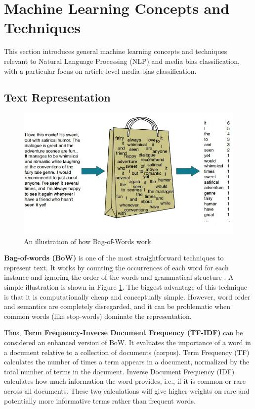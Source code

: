 \section{Machine Learning Concepts and Techniques}

This section introduces general machine learning concepts and techniques relevant to Natural Language Processing (NLP) and media bias classification, with a particular focus on article-level media bias classification.

\subsection{Text Representation}

\begin{figure}[htbp]
    \centering
    \includegraphics[width=0.7\linewidth]{images/bow_illustration.png}
    \caption{An illustration of how Bag-of-Words work \cite{rahul-2023-bow-medium}}
    \label{fig:bow_illustration}
\end{figure}

\textbf{Bag-of-words (BoW)} is one of the most straightforward techniques to represent text. It works by counting the occurrences of each word for each instance and ignoring the order of the words and grammatical structure \cite{qader-2019-bow}. A simple illustration is shown in Figure \ref{fig:bow_illustration}. The biggest advantage of this technique is that it is computationally cheap and conceptually simple. However, word order and semantics are completely disregarded, and it can be problematic when common words (like stop-words) dominate the representation.

Thus, \textbf{Term Frequency-Inverse Document Frequency (TF-IDF)} can be considered an enhanced version of BoW. It evaluates the importance of a word in a document relative to a collection of documents (corpus). Term Frequency (TF) calculates the number of times a term appears in a document, normalized by the total number of terms in the document. Inverse Document Frequency (IDF) calculates how much information the word provides, i.e., if it is common or rare across all documents. These two calculations will give higher weights on rare and potentially more informative terms rather than frequent words.

